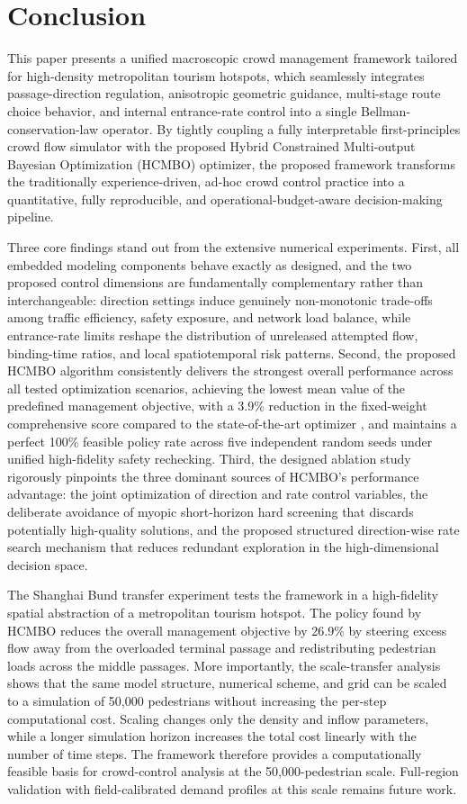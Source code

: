 \documentclass[lettersize,journal]{IEEEtran}
\begin{document}
\section{Conclusion}
\label{sec:conclusion}

This paper presents a unified macroscopic crowd management framework tailored for high-density metropolitan tourism hotspots, which seamlessly integrates passage-direction regulation, anisotropic geometric guidance, multi-stage route choice behavior, and internal entrance-rate control into a single Bellman-conservation-law operator. By tightly coupling a fully interpretable first-principles crowd flow simulator with the proposed Hybrid Constrained Multi-output Bayesian Optimization (HCMBO) optimizer, the proposed framework transforms the traditionally experience-driven, ad-hoc crowd control practice into a quantitative, fully reproducible, and operational-budget-aware decision-making pipeline.

Three core findings stand out from the extensive numerical experiments. First, all embedded modeling components behave exactly as designed, and the two proposed control dimensions are fundamentally complementary rather than interchangeable: direction settings induce genuinely non-monotonic trade-offs among traffic efficiency, safety exposure, and network load balance, while entrance-rate limits reshape the distribution of unreleased attempted flow, binding-time ratios, and local spatiotemporal risk patterns. Second, the proposed HCMBO algorithm consistently delivers the strongest overall performance across all tested optimization scenarios, achieving the lowest mean value of the predefined management objective, with a 3.9\% reduction in the fixed-weight comprehensive score compared to the state-of-the-art optimizer , and maintains a perfect 100\% feasible policy rate across five independent random seeds under unified high-fidelity safety rechecking. Third, the designed ablation study rigorously pinpoints the three dominant sources of HCMBO’s performance advantage: the joint optimization of direction and rate control variables, the deliberate avoidance of myopic short-horizon hard screening that discards potentially high-quality solutions, and the proposed structured direction-wise rate search mechanism that reduces redundant exploration in the high-dimensional decision space.

The Shanghai Bund transfer experiment tests the framework in a high-fidelity spatial abstraction of a metropolitan tourism hotspot. The policy found by HCMBO reduces the overall management objective by 26.9\% by steering excess flow away from the overloaded terminal passage and redistributing pedestrian loads across the middle passages. More importantly, the scale-transfer analysis shows that the same model structure, numerical scheme, and grid can be scaled to a simulation of 50,000 pedestrians without increasing the per-step computational cost. Scaling changes only the density and inflow parameters, while a longer simulation horizon increases the total cost linearly with the number of time steps. The framework therefore provides a computationally feasible basis for crowd-control analysis at the 50,000-pedestrian scale. Full-region validation with field-calibrated demand profiles at this scale remains future work.
\end{document}
